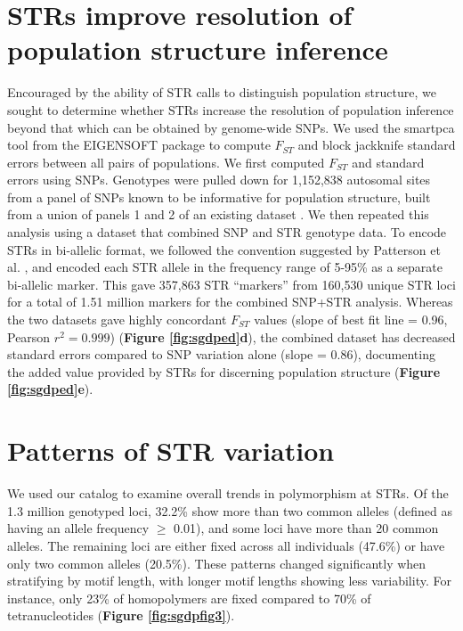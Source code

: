\section{STRs improve resolution of population structure inference}
Encouraged by the ability of STR calls to distinguish population structure, we sought to determine whether STRs increase the resolution of population inference beyond that which can be obtained by genome-wide SNPs. We used the smartpca tool from the EIGENSOFT \cite{PricePattersonPlengeEtAl2006} package to compute $F_{ST}$ and block jackknife standard errors between all pairs of populations. We first computed $F_{ST}$ and standard errors using SNPs. Genotypes were pulled down for 1,152,838 autosomal sites from a panel of SNPs known to be informative for population structure, built from a union of panels 1 and 2 of an existing dataset \cite{FuHajdinjakMoldovanEtAl2015}. We then repeated this analysis using a dataset that combined SNP and STR genotype data. To encode STRs in bi-allelic format, we followed the convention suggested by Patterson et al. \cite{PattersonPriceReich2006}, and encoded each STR allele in the frequency range of 5-95\% as a separate bi-allelic marker. This gave 357,863 STR ``markers'' from 160,530 unique STR loci for a total of 1.51 million markers for the combined SNP+STR analysis. Whereas the two datasets gave highly concordant $F_{ST}$ values (slope of best fit line = 0.96, Pearson $r^2=0.999$) (\textbf{Figure \ref{fig:sgdped}d}), the combined dataset has decreased standard errors compared to SNP variation alone (slope = 0.86), documenting the added value provided by STRs for discerning population structure (\textbf{Figure \ref{fig:sgdped}e}).

\section{Patterns of STR variation}
We used our catalog to examine overall trends in polymorphism at STRs. Of the 1.3 million genotyped loci, 32.2\% show more than two common alleles (defined as having an allele frequency $\geq$ 0.01), and some loci have more than 20 common alleles. The remaining loci are either fixed across all individuals (47.6\%) or have only two common alleles (20.5\%). These patterns changed significantly when stratifying by motif length, with longer motif lengths showing less variability. For instance, only 23\% of homopolymers are fixed compared to 70\% of tetranucleotides (\textbf{Figure \ref{fig:sgdpfig3}}). 

